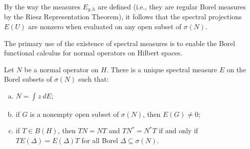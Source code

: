 \documentclass[10pt]{mypackage}
\begin{document}
\begin{remark}
  By the way the measures $E_{g,h}$ are defined (i.e., they are regular Borel measures by the Riesz Representation Theorem), it follows that the spectral projections $E\left( U \right)$ are nonzero when evaluated on any open subset of $\sigma(N)$.
\end{remark}
The primary use of the existence of spectral measures is to enable the Borel functional calculus for normal operators on Hilbert spaces.
\begin{theorem}
  Let $N$ be a normal operator on $H$. There is a unique spectral measure $E$ on the Borel subsets of $\sigma(N)$ such that:
  \begin{enumerate}[(a)]
    \item $N = \int_{}^{} z\:dE$;
    \item if $G$ is a nonempty open subset of $\sigma(N)$, then $E(G)\neq 0$;
    \item if $T\in B(H)$, then $TN = NT$ and $TN^{\ast} = N^{\ast}T$ if and only if $TE\left( \Delta \right) = E\left( \Delta \right)T$ for all Borel $\Delta\subseteq \sigma(N)$.
  \end{enumerate}
\end{theorem}
\end{document}
